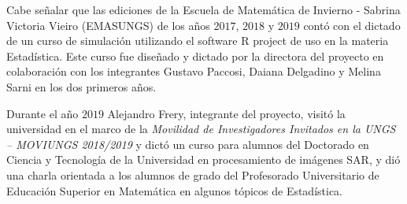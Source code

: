 \documentclass[11pt]{article}
\begin{document}
Cabe señalar que las ediciones de la Escuela de Matemática de Invierno - Sabrina Victoria Vieiro (EMASUNGS) de los años $2017$, $2018$ y $2019$ contó  con el dictado de un curso de simulación utilizando el software R project de uso en la materia Estadística. Este curso fue diseñado y dictado por la directora del proyecto en colaboración con los integrantes Gustavo Paccosi, Daiana Delgadino y Melina Sarni en los dos primeros años. 

Durante el año $2019$ Alejandro Frery, integrante del proyecto, visitó la universidad en el marco de la \textit{Movilidad de Investigadores Invitados en la UNGS – MOVIUNGS 2018/2019} y dictó un curso para alumnos del Doctorado en Ciencia y Tecnología de la Universidad en procesamiento de imágenes SAR, y dió una charla orientada a los alumnos de grado del  Profesorado Universitario de Educación Superior en Matemática en algunos tópicos de Estadística.  


%


\end{document}
